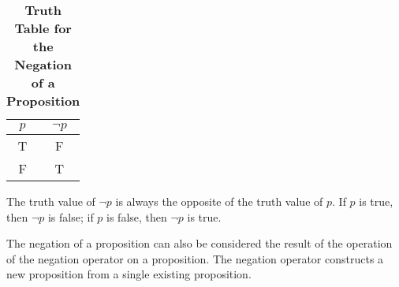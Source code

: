 \begin{table}[h!]
\centering
\caption*{\textbf{Truth Table for the Negation of a Proposition}}
\begin{tabular}{|c|c|}
\hline
\rowcolor{gray!20}
\textbf{$p$} & \textbf{$\neg p$} \\
\hline
T & F \\
F & T \\
\hline
\end{tabular}
\end{table}
\begin{tcolorbox}[colback=white, colframe=gray!60, title=Remark 1]
The truth value of $\neg p$ is always the opposite of the truth value of $p$. If $p$ is true, then $\neg p$ is false; if $p$ is false, then $\neg p$ is true.
\end{tcolorbox}
\begin{tcolorbox}[colback=white, colframe=gray!60, title=Remark 2]
The negation of a proposition can also be considered the result of the operation of the
negation operator on a proposition. The negation operator constructs a new proposition from
a single existing proposition.
\end{tcolorbox}


